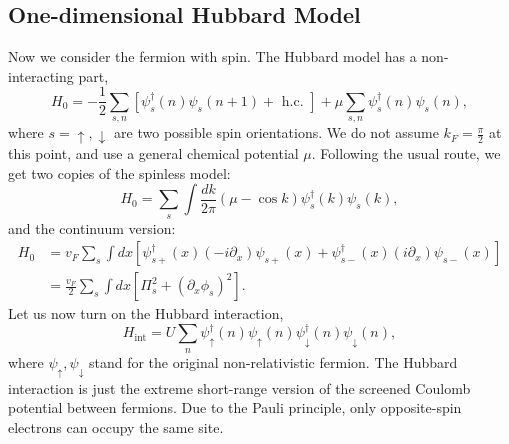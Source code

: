 \documentclass{SciPost}
\begin{document}
\subsection{One-dimensional Hubbard Model}
Now we consider the fermion with spin.
The Hubbard model has a non-interacting part,
\begin{equation}
	H_{0}=-\frac{1}{2} \sum_{s, n}\left[\psi_{s}^{\dagger}(n) \psi_{s}(n+1)+\text { h.c. }\right]+\mu \sum_{s, n} \psi_{s}^{\dagger}(n) \psi_{s}(n),
\end{equation}
where $s=\uparrow, \downarrow$ are two possible spin orientations. We do not assume $k_F = \frac{\pi}{2}$ at this point, and use a general chemical potential $\mu$.
Following the usual route, we get two copies of the spinless model:
\begin{equation}
	H_{0}=\sum_{s} \int \frac{d k}{2 \pi} (\mu-\cos k) \psi_{s}^{\dagger}(k) \psi_{s}(k),
\end{equation}
and the continuum version:
\begin{equation}
\begin{aligned}
	H_0 &= v_F \sum_{s} \int d x \left[
		\psi_{s+}^{\dagger}(x)\left(-i \partial_{x}\right) \psi_{s+}(x) +
		\psi_{s-}^{\dagger}(x)\left( i \partial_{x}\right) \psi_{s-}(x)
	\right] \\
	&= \frac{v_F}{2} \sum_s \int d x \left[\Pi_{s}^{2}+\left(\partial_x \phi_{s}\right)^{2}\right].
\end{aligned}
\end{equation}
Let us now turn on the Hubbard interaction,
\begin{equation}
	H_{\mathrm{int}}=U \sum_{n} \psi_{\uparrow}^{\dagger}(n) \psi_{\uparrow}(n) \psi_{\downarrow}^{\dagger}(n) \psi_{\downarrow}(n),
\end{equation}
where $\psi_{\uparrow}, \psi_{\downarrow}$ stand for the original non-relativistic fermion. 
The Hubbard interaction is just the extreme short-range version of the screened Coulomb potential between fermions. 
Due to the Pauli principle, only opposite-spin electrons can occupy the same site.
\end{document}
